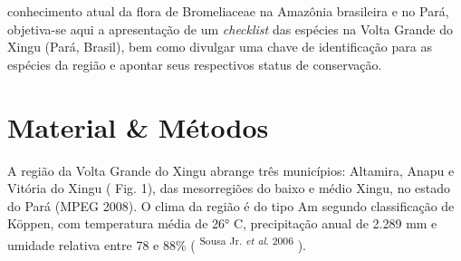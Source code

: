 \begin{multicols}{2}
conhecimento atual da flora de Bromeliaceae na Amazônia brasileira e no Pará,\allowbreak{} objetiva-\allowbreak{}se aqui a apresentação de um \textit{checklist} das espécies na Volta Grande do Xingu (\allowbreak{}Pará,\allowbreak{} Brasil)\allowbreak{},\allowbreak{} bem como divulgar uma chave de identificação para as espécies da região e apontar seus respectivos status de conservação.\allowbreak{}
\section*{Material \&\allowbreak{\allowbreak{}\allowbreak{}}\allowbreak{} Métodos}
\par{}A região da Volta Grande do Xingu abrange três municípios:\allowbreak{} Altamira,\allowbreak{} Anapu e Vitória do Xingu (\allowbreak{} Fig.\allowbreak{} 1)\allowbreak{},\allowbreak{} das mesorregiões do baixo e médio Xingu,\allowbreak{} no estado do Pará (\allowbreak{}MPEG 2008)\allowbreak{}.\allowbreak{} O clima da região é do tipo Am segundo classificação de Köppen,\allowbreak{} com temperatura média de 26° C,\allowbreak{} precipitação anual de 2.\allowbreak{}289 mm e umidade relativa entre 78 e 88\%\allowbreak{\allowbreak{}\allowbreak{}}\allowbreak{} (\allowbreak{} \textsuperscript{Sousa Jr.\allowbreak{} \textit{et al}.\allowbreak{} 2006 })\allowbreak{}.\allowbreak{}
\par
{
}
\end{multicols}
